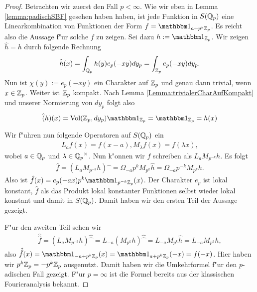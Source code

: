 		\begin{proof}
			Betrachten wir zuerst den Fall $p<\infty$. Wie wir eben in Lemma \ref{lemma:padischSBF} gesehen haben haben, ist jede Funktion in $S({\mathbb{Q}_p})$ eine Linearkombination von Funktionen der Form $f = \ind_{a+p^k\Zp}$. Es reicht also die Aussage f"ur solche $f$ zu zeigen.
			Sei dazu $h:= \ind_{\Zp}$. Wir zeigen $\hat{h} = h$ durch folgende Rechnung
			\begin{align*}
				\hat{h}(x) = \int_{\mathbb{Q}_p} h(y) e_p (-xy) dy_p = \int_{\mathbb{Z}_p} e_p(-xy) dy_p.
			\end{align*}
			Nun ist $\chi(y):=e_p(-xy)$ ein Charakter auf ${\mathbb{Z}_p}$ und genau dann trivial, wenn $x\in{\mathbb{Z}_p}$. 
			Weiter ist ${\mathbb{Z}_p}$ kompakt. 
			Nach Lemma \ref{Lemma:trivialerCharAufKompakt} und unserer Normierung von $dy_p$ folgt also
			\begin{align*}
				\hat(h)(x) = \text{Vol}(\Zp, dy_p) \ind_\Zp = \ind_\Zp = h(x)
			\end{align*}
			
			Wir f"uhren nun folgende Operatoren auf $S({\mathbb{Q}_p})$ ein
			\begin{align*}
				L_a f(x) = f(x-a), M_\lambda f(x) = f(\lambda x),
			\end{align*}
			wobei $a \in {\mathbb{Q}_p}$ und $\lambda \in {\mathbb{Q}_p}^\times$. 
			Nun k"onnen wir $f$ schreiben als $L_a M_{p^{-k}}h$. 
			Es folgt
			\begin{align*}
				\hat{f} = (L_a M_{p^{-k}}h)\widehat{\phantom{x}} = \Omega_{-a}p^{k}M_{p^k}\hat{h}=\Omega_{-a}p^{-k}M_{p^k}h.
			\end{align*}
			Also ist $\hat{f} (x) = e_p(-ax)p^k\ind_{p^{-k}\Zp}(x)$. 
			Der Charakter $e_p$ ist lokal konstant, $\hat{f}$ als das Produkt lokal konstanter Funktionen selbst wieder lokal konstant und damit in $S({\mathbb{Q}_p})$. 
			Damit haben wir den ersten Teil der Aussage gezeigt.
			
			F"ur den zweiten Teil sehen wir
			\begin{align*}
				\hat{\hat{f}} = (L_a M_{p^{-k}}h)\widehat{\widehat{\phantom{x}}} = L_{-a} (M_{p^k}h)\widehat{\widehat{\phantom{x}}}=L_{-a}M_{p^k}\hat{h} =L_{-a}M_{p^k}h,
			\end{align*}
			also $\hat{\hat{f}} (x) = \ind_{-a+p^k\Zp} (x) = \ind_{a+p^k\Zp} (-x) = f(-x)$. 
			Hier haben wir $p^k{\mathbb{Z}_p} = - p^k{\mathbb{Z}_p}$ ausgenutzt. 
			Damit haben wir die Umkehrformel f"ur den $p$-adischen Fall gezeigt. 
			F"ur $p=\infty$ ist die Formel bereits aus der klassischen Fourieranalysis bekannt.
		\end{proof}
		
